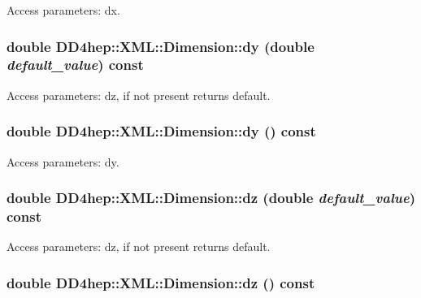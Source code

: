 Access parameters: dx. \hypertarget{struct_d_d4hep_1_1_x_m_l_1_1_dimension_a4810f7f9300523c5695737ec598745b0}{
\subsubsection[{dy}]{\setlength{\rightskip}{0pt plus 5cm}double DD4hep::XML::Dimension::dy (double {\em default\_\-value}) const}}
\label{struct_d_d4hep_1_1_x_m_l_1_1_dimension_a4810f7f9300523c5695737ec598745b0}


Access parameters: dz, if not present returns default. \hypertarget{struct_d_d4hep_1_1_x_m_l_1_1_dimension_aca78889c0705fa32ae7e7381b97c9d0c}{
\subsubsection[{dy}]{\setlength{\rightskip}{0pt plus 5cm}double DD4hep::XML::Dimension::dy () const}}
\label{struct_d_d4hep_1_1_x_m_l_1_1_dimension_aca78889c0705fa32ae7e7381b97c9d0c}


Access parameters: dy. \hypertarget{struct_d_d4hep_1_1_x_m_l_1_1_dimension_a55ace977e6d3c4daa023833fd7db5454}{
\subsubsection[{dz}]{\setlength{\rightskip}{0pt plus 5cm}double DD4hep::XML::Dimension::dz (double {\em default\_\-value}) const}}
\label{struct_d_d4hep_1_1_x_m_l_1_1_dimension_a55ace977e6d3c4daa023833fd7db5454}


Access parameters: dz, if not present returns default. \hypertarget{struct_d_d4hep_1_1_x_m_l_1_1_dimension_a431685c20775c15f137242d1d2dabd60}{
\subsubsection[{dz}]{\setlength{\rightskip}{0pt plus 5cm}double DD4hep::XML::Dimension::dz () const}}
\label{struct_d_d4hep_1_1_x_m_l_1_1_dimension_a431685c20775c15f137242d1d2dabd60}


